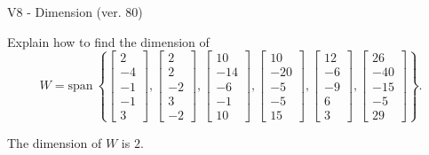 \begin{exercise}
  \begin{exerciseTitle}V8 - Dimension (ver. 80)\end{exerciseTitle}
  \begin{exerciseStatement}
    Explain how to find the dimension of 
\[W=\mathrm{span}\ \left\{\left[\begin{array}{r}
2 \\
-4 \\
-1 \\
-1 \\
3
\end{array}\right] , \left[\begin{array}{r}
2 \\
2 \\
-2 \\
3 \\
-2
\end{array}\right] , \left[\begin{array}{r}
10 \\
-14 \\
-6 \\
-1 \\
10
\end{array}\right] , \left[\begin{array}{r}
10 \\
-20 \\
-5 \\
-5 \\
15
\end{array}\right] , \left[\begin{array}{r}
12 \\
-6 \\
-9 \\
6 \\
3
\end{array}\right] , \left[\begin{array}{r}
26 \\
-40 \\
-15 \\
-5 \\
29
\end{array}\right]\right\}.\]



  \end{exerciseStatement}
  \begin{exerciseAnswer}
   The dimension of \(W\) is  \(2\).
  


  \end{exerciseAnswer}
\end{exercise}
